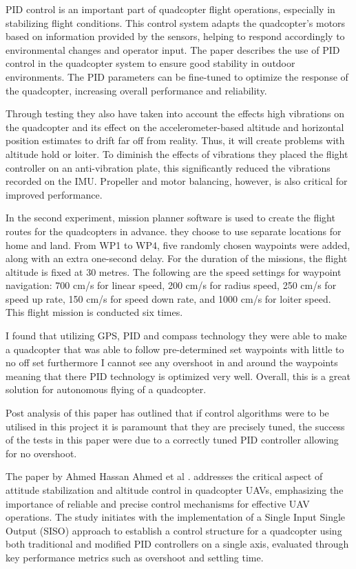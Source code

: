 \documentclass{article}
\begin{document}
PID control is an important part of quadcopter flight operations, especially in
stabilizing flight conditions. This control system adapts the quadcopter's
motors based on information provided by the sensors, helping to respond
accordingly to environmental changes and operator input. The paper describes the
use of PID control in the quadcopter system to ensure good stability in outdoor
environments. The PID parameters can be fine-tuned to optimize the response of
the quadcopter, increasing overall performance and reliability.

Through testing they also have taken into account the effects high vibrations on
the quadcopter and its effect on the accelerometer-based altitude and horizontal
position estimates to drift far off from reality. Thus, it will create problems
with altitude hold or loiter. To diminish the effects of vibrations they placed
the flight controller on an anti-vibration plate, this significantly reduced the
vibrations recorded on the IMU. Propeller and motor balancing, however, is also
critical for improved performance.

In the second experiment, mission planner software is used to create the flight
routes for the quadcopters in advance. they choose to use separate locations for
home and land. From WP1 to WP4, five randomly chosen waypoints were added, along
with an extra one-second delay. For the duration of the missions, the flight
altitude is fixed at 30 metres. The following are the speed settings for
waypoint navigation: 700 cm/s for linear speed, 200 cm/s for radius speed, 250
cm/s for speed up rate, 150 cm/s for speed down rate, and 1000 cm/s for loiter
speed. This flight mission is conducted six times.

I found that utilizing GPS, PID and compass technology they were able to make a
quadcopter that was able to follow pre-determined set waypoints with little to
no off set furthermore I cannot see any overshoot in and around the waypoints
meaning that there PID technology is optimized very well. Overall, this is a
great solution for autonomous flying of a quadcopter.

Post analysis of this paper has outlined that if control algorithms were to be
utilised in this project it is paramount that they are precisely tuned, the
success of the tests in this paper were due to a correctly tuned PID controller
allowing for no overshoot. 

The paper by Ahmed Hassan Ahmed et al \cite{AhmedHassan2016}. addresses the
critical aspect of attitude stabilization and altitude control in quadcopter
UAVs, emphasizing the importance of reliable and precise control mechanisms for
effective UAV operations. The study initiates with the implementation of a
Single Input Single Output (SISO) approach to establish a control structure for
a quadcopter using both traditional and modified PID controllers on a single
axis, evaluated through key performance metrics such as overshoot and settling
time.
\end{document}
